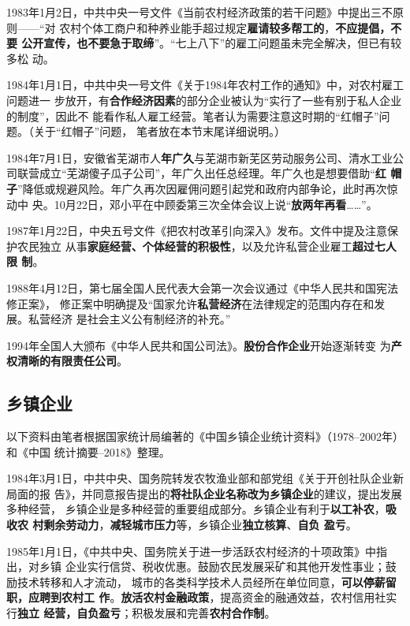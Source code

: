 1983年1月2日，中共中央一号文件《当前农村经济政策的若干问题》中提出三不原则——“对
农村个体工商户和种养业能手超过规定\textbf{雇请较多帮工的}，\textbf{不应提倡，不要
  公开宣传，也不要急于取缔}”。“七上八下”的雇工问题虽未完全解决，但已有较多松
动。

1984年1月1日，中共中央一号文件《关于1984年农村工作的通知》中，对农村雇工问题进一
步放开，有\textbf{合作经济因素}的部分企业被认为“实行了一些有别于私人企业的制度”，因此不
能看作私人雇工经营。笔者认为需要注意这时期的“红帽子”问题。（关于“红帽子”问题，
笔者放在本节末尾详细说明。）

1984年7月1日，安徽省芜湖市人\textbf{年广久}与芜湖市新芜区劳动服务公司、清水工业公
司联营成立“芜湖傻子瓜子公司”，年广久出任总经理。年广久也是想要借助“\textbf{红
  帽子}”降低或规避风险。年广久再次因雇佣问题引起党和政府内部争论，此时再次惊动中
央。10月22日，邓小平在中顾委第三次全体会议上说“\textbf{放两年再看}……”。

1987年1月22日，中央五号文件《把农村改革引向深入》发布。文件中提及注意保护农民独立
从事\textbf{家庭经营、个体经营的积极性}，以及允许私营企业雇工\textbf{超过七人限
  制}。

1988年4月12日，第七届全国人民代表大会第一次会议通过《中华人民共和国宪法修正案》，
修正案中明确提及“国家允许\textbf{私营经济}在法律规定的范围内存在和发展。私营经济
是社会主义公有制经济的补充。”

1994年全国人大颁布《中华人民共和国公司法》。\textbf{股份合作企业}开始逐渐转变
为\textbf{产权清晰的有限责任公司}。

\subsection{乡镇企业}

以下资料由笔者根据国家统计局编著的《中国乡镇企业统计资料》（1978--2002年）和《中国
统计摘要--2018》整理。




1984年3月1日，中共中央、国务院转发农牧渔业部和部党组《关于开创社队企业新局面的报
告》，并同意报告提出的\textbf{将社队企业名称改为乡镇企业}的建议，提出发展多种经营，
乡镇企业是多种经营的重要组成部分。乡镇企业有利于\textbf{以工补农}，\textbf{吸收农
  村剩余劳动力}，\textbf{减轻城市压力}等，乡镇企业\textbf{独立核算}、\textbf{自负
  盈亏}。

1985年1月1日，《中共中央、国务院关于进一步活跃农村经济的十项政策》中指出，对乡镇
企业实行信贷、税收优惠。鼓励农民发展采矿和其他开发性事业；鼓励技术转移和人才流动，
城市的各类科学技术人员经所在单位同意，\textbf{可以停薪留职，应聘到农村工
  作}。\textbf{放活农村金融政策}，提高资金的融通效益，农村信用社实行\textbf{独立
  经营，自负盈亏}；积极发展和完善\textbf{农村合作制}。

